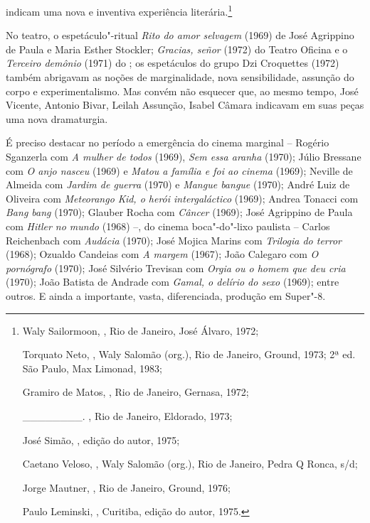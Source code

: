indicam uma nova e inventiva experiência literária.\footnote{Waly Sailormoon, {}, Rio de Janeiro, José Álvaro, 1972;

  Torquato Neto, {}, Waly Salomão (org.),
  Rio de Janeiro, Ground, 1973; 2ª ed. São Paulo, Max Limonad, 1983;

  Gramiro de Matos, {}, Rio de Janeiro, Gernasa, 1972;

  \_\_\_\_\_\_\_\_. {},
  Rio de Janeiro, Eldorado, 1973;

  José Simão, {}, edição do autor, 1975;

  Caetano Veloso, {}, Waly Salomão (org.), Rio de
  Janeiro, Pedra Q Ronca, s/d;

  Jorge Mautner, {}, Rio de Janeiro, Ground,
  1976;

  Paulo Leminski, {}, Curitiba, edição do autor, 1975.}

No teatro, o espetáculo"-ritual \emph{Rito do amor selvagem} (1969) de
José Agrippino de Paula e Maria Esther Stockler; \emph{Gracias, señor}
(1972) do Teatro Oficina e o \emph{Terceiro demônio} (1971) do ; os
espetáculos do grupo Dzi Croquettes (1972) também abrigavam as noções de
marginalidade, nova sensibilidade, assunção do corpo e experimentalismo.
Mas convém não esquecer que, ao mesmo tempo, José Vicente, Antonio
Bivar, Leilah Assunção, Isabel Câmara indicavam em suas peças uma nova
dramaturgia.

É preciso destacar no período a emergência do cinema marginal -- Rogério
Sganzerla com \emph{A mulher de todos} (1969), \emph{Sem essa aranha}
(1970); Júlio Bressane com \emph{O anjo nasceu} (1969) e \emph{Matou a
família e foi ao cinema} (1969); Neville de Almeida com \emph{Jardim de
guerra} (1970) e \emph{Mangue bangue} (1970); André Luiz de Oliveira com
\emph{Meteorango Kid, o herói intergaláctico} (1969); Andrea Tonacci com
\emph{Bang bang} (1970); Glauber Rocha com \emph{Câncer} (1969); José
Agrippino de Paula com \emph{Hitler no  mundo} (1968) --, do cinema
boca"-do"-lixo paulista -- Carlos Reichenbach com \emph{Audácia} (1970);
José Mojica Marins com \emph{Trilogia do terror} (1968); Ozualdo
Candeias com \emph{A margem} (1967); João Calegaro com \emph{O
pornógrafo} (1970); José Silvério Trevisan com \emph{Orgia ou o homem
que deu cria} (1970); João Batista de Andrade com \emph{Gamal, o delírio
do sexo} (1969); entre outros. E ainda a importante, vasta,
diferenciada, produção em Super"-8.

